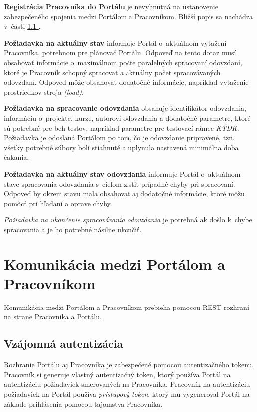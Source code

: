 \documentclass[
  digital, %
  oneside, %
  table,   %
  lof,     %
  lot,   %
]{fithesis3}
\newcommand*{\fullref}[1]{\hyperref[{#1}]{\ref*{#1} \nameref*{#1}}}
\begin{document}
\textbf{Registrácia Pracovníka do Portálu} je nevyhnutná na ustanovenie zabezpečeného spojenia medzi Portálom a Pracovníkom. Bližší popis sa nachádza v~časti \fullref{komunikacia-portal-pracovnik}.

\textbf{Požiadavka na aktuálny stav} informuje Portál o~aktuálnom vyťažení Pracovníka, potrebnom pre plánovač Portálu. Odpoveď na tento dotaz musí obsahovať informácie o~maximálnom počte paralelných spracovaní odovzdaní, ktoré je Pracovník schopný spracovať a aktuálny počet spracovávaných odovzdaní. Odpoveď môže obsahovať dodatočné informácie, napríklad vyťaženie prostriedkov stroja \emph{(load)}.

\textbf{Požiadavka na spracovanie odovzdania} obsahuje identifikátor odovzdania, informáciu o~projekte, kurze, autorovi odovzdania a dodatočné parametre, ktoré sú potrebné pre beh testov, napríklad parametre pre testovací rámec \emph{KTDK}. Požiadavka je odoslaná Portálom po tom, čo je odovzdanie pripravené, tzn. všetky potrebné súbory boli stiahnuté a uplynula nastavená minimálna doba čakania.

\textbf{Požiadavka na aktuálny stav odovzdania} informuje Portál o~aktuálnom stave spracovania odovzdania s~cieľom zistiť prípadné chyby pri spracovaní. Odpoveď by okrem stavu mala obsahovať aj dodatočné informácie, ktoré môžu pomôcť pri hľadaní a oprave chyby.

\emph{Požiadavka na ukončenie spracovávania odovzdania} je potrebná ak došlo k~chybe spracovania a je ho potrebné násilne ukončiť.

\section{Komunikácia medzi Portálom a Pracovníkom}

Komunikácia medzi Portálom a Pracovníkom prebieha pomocou REST rozhraní na strane Pracovníka a Portálu. 

\subsection{Vzájomná autentizácia}
\label{komunikacia-portal-pracovnik}

Rozhranie Portálu aj Pracovníka je zabezpečené pomocou autentizačného tokenu. Pracovník si generuje vlastný autentizačný token, ktorý používa Portál na autentizáciu požiadaviek smerovaných na Pracovníka. Pracovník na autentizáciu požiadaviek na Portál používa \emph{prístupový token}, ktorý mu vygeneroval Portál na základe prihlásenia pomocou tajomstva Pracovníka.
\end{document}
